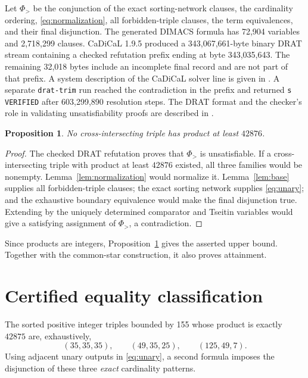 \documentclass[11pt]{article}
\newtheorem{proposition}[theorem]{Proposition}
\begin{document}
Let $\Phi_{>}$ be the conjunction of the exact sorting-network clauses, the
cardinality ordering, \eqref{eq:normalization}, all forbidden-triple clauses,
the term equivalences, and their final disjunction.  The generated DIMACS
formula has 72,904 variables and 2,718,299 clauses.  CaDiCaL 1.9.5 produced a
343,067,661-byte binary DRAT stream containing a checked refutation prefix
ending at byte 343,035,643.  The remaining 32,018 bytes include an incomplete
final record and are not part of that prefix.  A system description of the
CaDiCaL solver line is given in \cite{BiereEtAl2024}.  A separate
\texttt{drat-trim} run reached the contradiction in the prefix and returned
\texttt{s VERIFIED} after 603,299,890 resolution steps.  The DRAT format and
the checker's role in validating unsatisfiability proofs are described in
\cite{WetzlerHeuleHunt2014}.

\begin{proposition}\label{prop:upper}
No cross-intersecting triple has product at least $42876$.
\end{proposition}

\begin{proof}
The checked DRAT refutation proves that $\Phi_{>}$ is unsatisfiable.  If a
cross-intersecting triple with product at least $42876$ existed, all three
families would be nonempty.  Lemma~\ref{lem:normalization} would normalize it.
Lemma~\ref{lem:base} supplies all forbidden-triple clauses; the exact sorting
network supplies \eqref{eq:unary}; and the exhaustive boundary equivalence
would make the final disjunction true.  Extending by the uniquely determined
comparator and Tseitin variables would give a satisfying assignment of
$\Phi_{>}$, a contradiction.
\end{proof}

Since products are integers, Proposition~\ref{prop:upper} gives the asserted
upper bound.  Together with the common-star construction, it also proves
attainment.

\section{Certified equality classification}

The sorted positive integer triples bounded by 155 whose product is exactly
$42875$ are, exhaustively,
\begin{equation}\label{eq:size-triples}
 (35,35,35),\qquad (49,35,25),\qquad (125,49,7).
\end{equation}
Using adjacent unary outputs in \eqref{eq:unary}, a second formula imposes the
disjunction of these three \emph{exact} cardinality patterns.
\end{document}
